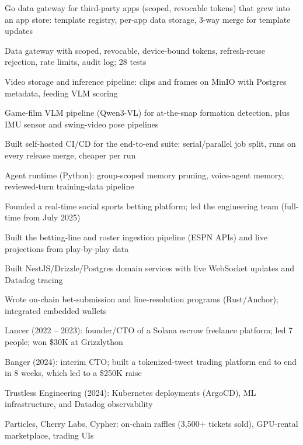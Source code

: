 \documentclass[print]{jack-resume}
\begin{document}
\begin{tightemize}
    \item Go data gateway for third-party apps (scoped, revocable tokens) that grew into an app store: template registry, per-app data storage, 3-way merge for template updates
    \item Data gateway with scoped, revocable, device-bound tokens, refresh-reuse rejection, rate limits, audit log; 28 tests
    \item Video storage and inference pipeline: clips and frames on MinIO with Postgres metadata, feeding VLM scoring
    \item Game-film VLM pipeline (Qwen3-VL) for at-the-snap formation detection, plus IMU sensor and swing-video pose pipelines
    \item Built self-hosted CI/CD for the end-to-end suite: serial/parallel job split, runs on every release merge, cheaper per run
    \item Agent runtime (Python): group-scoped memory pruning, voice-agent memory, reviewed-turn training-data pipeline
\end{tightemize}
\sectionsep

\begin{tightemize}
    \item Founded a real-time social sports betting platform; led the engineering team (full-time from July 2025)
    \item Built the betting-line and roster ingestion pipeline (ESPN APIs) and live projections from play-by-play data
    \item Built NestJS/Drizzle/Postgres domain services with live WebSocket updates and Datadog tracing
    \item Wrote on-chain bet-submission and line-resolution programs (Rust/Anchor); integrated embedded wallets
\end{tightemize}
\sectionsep

\begin{tightemize}
    \item Lancer (2022 – 2023): founder/CTO of a Solana escrow freelance platform; led 7 people; won \$30K at Grizzlython
    \item Banger (2024): interim CTO; built a tokenized-tweet trading platform end to end in 8 weeks, which led to a \$250K raise
    \item Trustless Engineering (2024): Kubernetes deployments (ArgoCD), ML infrastructure, and Datadog observability
    \item Particles, Cherry Labs, Cypher: on-chain raffles (3,500+ tickets sold), GPU-rental marketplace, trading UIs
\end{tightemize}
\sectionsep
\end{document}
